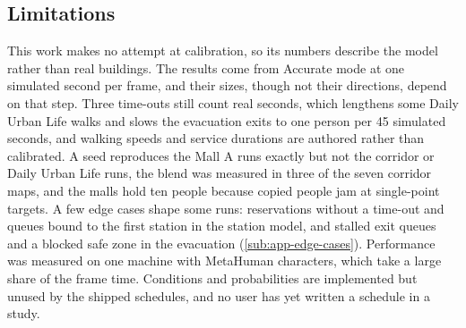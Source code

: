 \subsection{Limitations}\label{sub:conclusions-limitations}

This work makes no attempt at calibration, so its numbers describe the model rather than real buildings. The results come from Accurate mode at one simulated second per frame, and their sizes, though not their directions, depend on that step. Three time-outs still count real seconds, which lengthens some Daily Urban Life walks and slows the evacuation exits to one person per 45 simulated seconds, and walking speeds and service durations are authored rather than calibrated. A seed reproduces the Mall A runs exactly but not the corridor or Daily Urban Life runs, the blend was measured in three of the seven corridor maps, and the malls hold ten people because copied people jam at single-point targets. A few edge cases shape some runs: reservations without a time-out and queues bound to the first station in the station model, and stalled exit queues and a blocked safe zone in the evacuation (\cref{sub:app-edge-cases}). Performance was measured on one machine with MetaHuman characters, which take a large share of the frame time. Conditions and probabilities are implemented but unused by the shipped schedules, and no user has yet written a schedule in a study.

